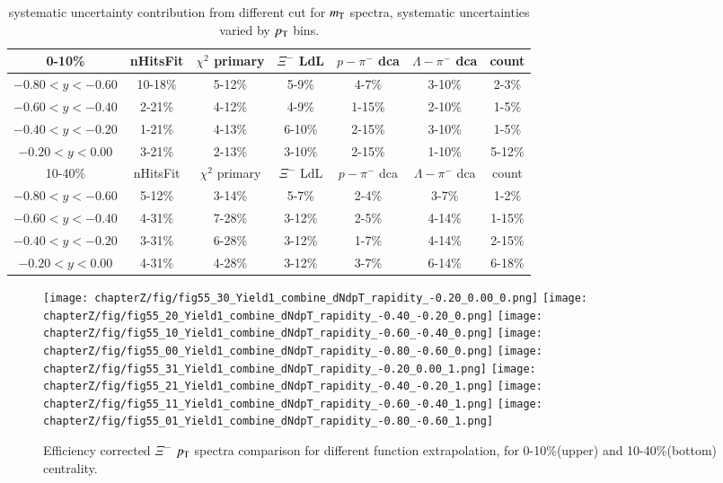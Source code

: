 \begin{table}[]
    \centering
    \begin{tabular}{|c|c|c|c|c|c|c|}
    \hline
        0-10\% & nHitsFit & $\chi^{2}$ primary & $\Xi^{-}$ LdL & $p-\pi^{-}$ dca & $\Lambda-\pi^{-}$ dca & count \\ \hline
        $-0.80<y<-0.60$ &10-18\% & 5-12\% & 5-9\% & 4-7\% & 3-10\% & 2-3\%   \\
        $-0.60<y<-0.40$ &2-21\% & 4-12\% & 4-9\% & 1-15\% & 2-10\% & 1-5\%   \\
        $-0.40<y<-0.20$ &1-21\% & 4-13\% & 6-10\% & 2-15\% & 3-10\% & 1-5\%   \\
        $-0.20<y<0.00$  &3-21\% & 2-13\% & 3-10\% & 2-15\% & 1-10\% & 5-12\%   \\
        \hline
        10-40\% & nHitsFit & $\chi^{2}$ primary & $\Xi^{-}$ LdL & $p-\pi^{-}$ dca & $\Lambda-\pi^{-}$ dca & count \\ \hline
        $-0.80<y<-0.60$ &5-12\% & 3-14\% & 5-7\% & 2-4\% & 3-7\% & 1-2\%   \\
        $-0.60<y<-0.40$ &4-31\% & 7-28\% & 3-12\% & 2-5\% & 4-14\% & 1-15\%   \\
        $-0.40<y<-0.20$ &3-31\% & 6-28\% & 3-12\% & 1-7\% & 4-14\% & 2-15\%   \\
        $-0.20<y<0.00$  &4-31\% & 4-28\% & 3-12\% & 3-7\% & 6-14\% & 6-18\%   \\
        \hline
    \end{tabular}
    \caption{systematic uncertainty contribution from different cut for $m_{\rm T}$ spectra, systematic uncertainties varied by $p_{\rm T}$ bins.}
    \label{tab:syserr_dNdmT_y}
\end{table}


\begin{figure*}[hbt!]
\texttt{[image: chapterZ/fig/fig55\_30\_Yield1\_combine\_dNdpT\_rapidity\_-0.20\_0.00\_0.png]}
\texttt{[image: chapterZ/fig/fig55\_20\_Yield1\_combine\_dNdpT\_rapidity\_-0.40\_-0.20\_0.png]}
\texttt{[image: chapterZ/fig/fig55\_10\_Yield1\_combine\_dNdpT\_rapidity\_-0.60\_-0.40\_0.png]}
\texttt{[image: chapterZ/fig/fig55\_00\_Yield1\_combine\_dNdpT\_rapidity\_-0.80\_-0.60\_0.png]}
\texttt{[image: chapterZ/fig/fig55\_31\_Yield1\_combine\_dNdpT\_rapidity\_-0.20\_0.00\_1.png]}
\texttt{[image: chapterZ/fig/fig55\_21\_Yield1\_combine\_dNdpT\_rapidity\_-0.40\_-0.20\_1.png]}
\texttt{[image: chapterZ/fig/fig55\_11\_Yield1\_combine\_dNdpT\_rapidity\_-0.60\_-0.40\_1.png]}
\texttt{[image: chapterZ/fig/fig55\_01\_Yield1\_combine\_dNdpT\_rapidity\_-0.80\_-0.60\_1.png]}
\caption{Efficiency corrected $\Xi^{-}$ $p_{\rm T}$ spectra comparison for different function extrapolation, for 0-10\%(upper) and 10-40\%(bottom) centrality.}
\label{fig:dNdpT_y}
\end{figure*}

